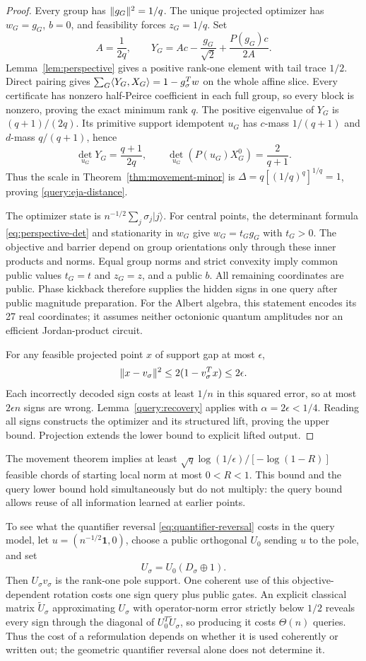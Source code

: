 \begin{proof}
Every group has $\lVert g_G\rVert^2=1/q$. The unique projected optimizer has
$w_G=g_G$, $b=0$, and feasibility forces $z_G=1/q$. Set
\[
 A=\frac1{2q},\qquad
 Y_G=Ac-\frac{g_G}{\sqrt2}+\frac{P(g_G)c}{2A}.
\]
Lemma~\ref{lem:perspective} gives a positive rank-one element with tail
trace $1/2$. Direct pairing gives
$\sum_G\langle Y_G,X_G\rangle=1-g_\sigma^Tw$ on the whole affine slice.
Every certificate has nonzero half-Peirce coefficient in each full group,
so every block is nonzero, proving the exact minimum rank $q$.
The positive eigenvalue of $Y_G$ is $(q+1)/(2q)$. Its primitive support
idempotent $u_G$ has $c$-mass $1/(q+1)$ and $d$-mass $q/(q+1)$, hence
\[
 \det_{u_G}Y_G=\frac{q+1}{2q},\qquad
 \det_{u_G}(P(u_G)X_G^0)=\frac2{q+1}.
\]
Thus the scale in Theorem~\ref{thm:movement-minor} is
$\Delta=q[(1/q)^q]^{1/q}=1$, proving \eqref{query:eja-distance}.

The optimizer state is $n^{-1/2}\sum_j\sigma_j|j\rangle$.
For central points, the determinant formula
\eqref{eq:perspective-det} and stationarity in $w_G$ give
$w_G=t_Gg_G$ with $t_G>0$. The objective and barrier depend on group
orientations only through these inner products and norms. Equal group
norms and strict convexity imply common public values $t_G=t$ and $z_G=z$,
and a public $b$. All remaining coordinates are public. Phase kickback
therefore supplies the hidden signs in one query after public magnitude
preparation. For the Albert algebra, this statement encodes its 27 real
coordinates; it assumes neither octonionic quantum amplitudes nor an
efficient Jordan-product circuit.

For any feasible projected point $x$ of support gap at most $\epsilon$,
\[
 \lVert x-v_\sigma\rVert^2\leq2(1-v_\sigma^Tx)\leq2\epsilon.
\]
Each incorrectly decoded sign costs at least $1/n$ in this squared error,
so at most $2\epsilon n$ signs are wrong. Lemma~\ref{query:recovery}
applies with $\alpha=2\epsilon<1/4$. Reading all signs constructs the
optimizer and its structured lift, proving the upper bound. Projection
extends the lower bound to explicit lifted output.
\end{proof}

The movement theorem implies at least
$\sqrt q\log(1/\epsilon)/[-\log(1-R)]$ feasible chords of starting local
norm at most $0<R<1$. This bound and the query lower bound hold
simultaneously but do not multiply: the query bound allows reuse of all
information learned at earlier points.

To see what the quantifier reversal \eqref{eq:quantifier-reversal} costs
in the query model, let $u=(n^{-1/2}\mathbf1,0)$, choose a public orthogonal
$U_0$ sending $u$ to the pole, and set
\[
 U_\sigma=U_0(D_\sigma\oplus1).
\]
Then $U_\sigma v_\sigma$ is the rank-one pole support. One coherent use of
this objective-dependent rotation costs one sign query plus public gates.
An explicit classical matrix $\widetilde U_\sigma$ approximating
$U_\sigma$ with operator-norm error strictly below $1/2$ reveals every
sign through the diagonal of $U_0^T\widetilde U_\sigma$, so producing it
costs $\Theta(n)$ queries. Thus the cost of a reformulation depends on
whether it is used coherently or written out; the geometric quantifier
reversal alone does not determine it.

